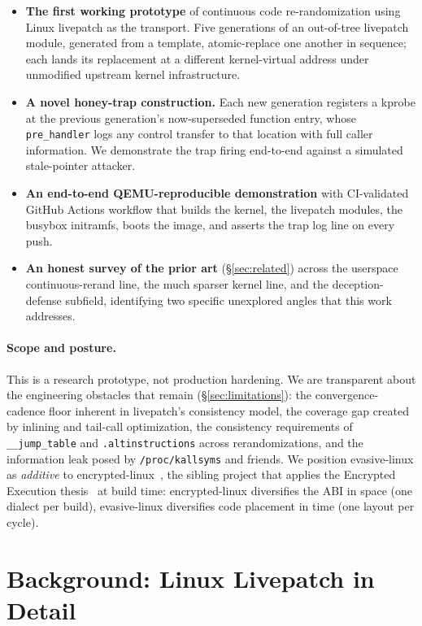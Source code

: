 \documentclass[10pt,letterpaper]{article}
\begin{document}
\begin{itemize}[leftmargin=*]
\item \textbf{The first working prototype} of continuous code
re-randomization using Linux livepatch as the transport. Five
generations of an out-of-tree livepatch module, generated from a
template, atomic-replace one another in sequence; each lands its
replacement at a different kernel-virtual address under unmodified
upstream kernel infrastructure.
\item \textbf{A novel honey-trap construction.} Each new generation
registers a kprobe at the previous generation's now-superseded
function entry, whose \texttt{pre\_handler} logs any control transfer
to that location with full caller information. We demonstrate the
trap firing end-to-end against a simulated stale-pointer attacker.
\item \textbf{An end-to-end QEMU-reproducible demonstration} with
CI-validated GitHub Actions workflow that builds the kernel, the
livepatch modules, the busybox initramfs, boots the image, and
asserts the trap log line on every push.
\item \textbf{An honest survey of the prior art} (\S\ref{sec:related})
across the userspace continuous-rerand line, the much sparser kernel
line, and the deception-defense subfield, identifying two specific
unexplored angles that this work addresses.
\end{itemize}

\paragraph{Scope and posture.} This is a research prototype, not
production hardening. We are transparent about the engineering
obstacles that remain (\S\ref{sec:limitations}): the convergence-cadence
floor inherent in livepatch's consistency model, the coverage gap
created by inlining and tail-call optimization, the consistency
requirements of \texttt{\_\_jump\_table} and \texttt{.altinstructions}
across rerandomizations, and the information leak posed by
\texttt{/proc/kallsyms} and friends. We position evasive-linux as
\emph{additive} to encrypted-linux~\cite{encrypted_linux}, the
sibling project that applies the Encrypted Execution
thesis~\cite{encrypted_execution} at build time: encrypted-linux
diversifies the ABI in space (one dialect per build),
evasive-linux diversifies code placement in time (one layout per
cycle).

\section{Background: Linux Livepatch in Detail}
\label{sec:background}
\end{document}
